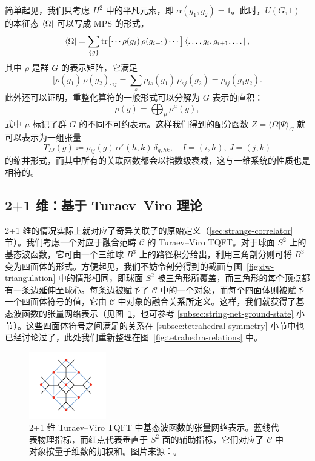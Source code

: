 简单起见，我们只考虑 $H^2$ 中的平凡元素，即 $\alpha(g_1, g_2)=1$。此时，$U(G,1)$ 的本征态 $\bra{\Omega}$ 可以写成 MPS 的形式，
\begin{equation}
    \bra{\Omega}
  = \sum_{\{g\}} \tr\bigl[ \cdots \rho(g_i) \, \rho(g_{i+1}) \cdots \bigr]
    \bra{\dots, g_i, g_{i+1}, \dots},
\end{equation}
其中 $\rho$ 是群 $G$ 的表示矩阵，它满足
\begin{equation}
  \bigl[ \rho(g_1) \, \rho(g_2) \bigr]_{ij} = \sum_s \rho_{is}(g_1) \, \rho_{sj}(g_2) = \rho_{ij}(g_1 g_2).
\end{equation}
此外还可以证明，重整化算符的一般形式可以分解为 $G$ 表示的直积：
\begin{equation}
  \rho(g) = \bigoplus_\mu \rho^\mu(g),
\end{equation}
式中 $\mu$ 标记了群 $G$ 的不同不可约表示。这样我们得到的配分函数 $Z=\langle\Omega|\Psi\rangle_G$ 就可以表示为一组张量
\begin{equation}
  T_{IJ}(g) \coloneq \rho_{ij}(g) \, \alpha^\varepsilon(h,k) \, \delta_{g, hk}, \quad
  I = (i,h), \, J = (j,k)
\end{equation}
的缩并形式，而其中所有的关联函数都会以指数级衰减，这与一维系统的性质也是相符的。

\subsection{2+1 维：基于 Turaev--Viro 理论}
\label{subsec:holographic-tensor-network-2+1d}

2+1 维的情况实际上就对应了奇异关联子的原始定义（\ref{sec:strange-correlator} 节）。我们考虑一个对应于融合范畴 $\mathcal{C}$ 的 Turaev--Viro TQFT。对于球面 $S^2$ 上的基态波函数，它可由一个三维球 $B^3$ 上的路径积分给出，利用三角剖分则可将 $B^3$ 变为四面体的形式。方便起见，我们不妨令剖分得到的截面与图~\ref{fig:dw-triangulation} 中的情形相同，即球面 $S^2$ 被三角形所覆盖，而三角形的每个顶点都有一条边延伸至球心。每条边被赋予了 $\mathcal{C}$ 中的一个对象，而每个四面体则被赋予一个四面体符号的值，它由 $\mathcal{C}$ 中对象的融合关系所定义。这样，我们就获得了基态波函数的张量网络表示（见图~\ref{fig:ground-state-wave-function}，也可参考 \ref{subsec:string-net-ground-state} 小节）。这些四面体符号之间满足的关系在 \ref{subsec:tetrahedral-symmetry} 小节中也已经讨论过了，此处我们重新整理在图~\ref{fig:tetrahedra-relations} 中。

\begin{figure}[htb]
  \centering
  \includegraphics[width=0.3\textwidth]{images/holographic/ground-state-wave-function.png}
  \caption[2+1 维 Turaev--Viro TQFT 中基态波函数的张量网络表示]{2+1 维 Turaev--Viro TQFT 中基态波函数的张量网络表示。蓝线代表物理指标，而红点代表垂直于 $S^2$ 面的辅助指标，它们对应了 $\mathcal{C}$ 中对象按量子维数的加权和。图片来源：\parencite{chen2022exact}。}
  \label{fig:ground-state-wave-function}
\end{figure}

